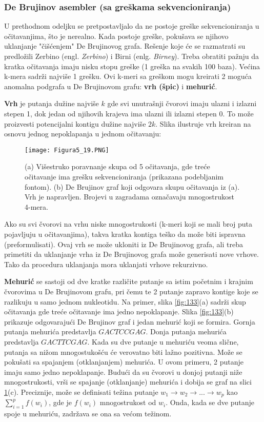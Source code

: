 \documentclass[12pt,oneside]{memoir}
\begin{document}
\subsubsection{De Brujinov asembler (sa greškama sekvencioniranja)}

U prethodnom odeljku se pretpostavljalo da ne postoje greške sekvencioniranja u očitavanjima, što je nerealno. Kada postoje greške, pokušava se njihovo uklanjanje "čišćenjem" De Brujinovog grafa. Rešenje koje će se razmatrati su predložili Zerbino (engl. \textit{Zerbino}) i Birni (enlg. \textit{Birney}). Treba obratiti pažnju da kratka očitavanja imaju nisku stopu greške (1 greška na svakih 100 baza). Većina k-mera sadrži najviše 1 grešku. Ovi k-meri sa greškom mogu kreirati 2 moguća anomalna podgrafa u De Brujinovom grafu: \textbf{vrh (špic)} i \textbf{mehurić}.

\newpage

\textbf{Vrh} je putanja dužine najviše $k$ gde svi unutrašnji čvorovi imaju ulazni i izlazni stepen 1, dok jedan od njihovih krajeva ima ulazni ili izlazni stepen 0. To može proizvesti potencijalni kontigu dužine najviše $2k$. Slika \label{fig:13} ilustruje vrh kreiran na osnovu jednog nepoklapanja u jednom očitavanju: 

\begin{figure}[!ht]
\centering
\texttt{[image: Figura5\_19.PNG]}
\caption{(a) Višestruko poravnanje skupa od 5 očitavanja, gde treće očitavanje ima grešku sekvencioniranja (prikazana podebljanim fontom). (b) De Brujinov graf koji odgovara skupu očitavanja iz (a). Vrh je napravljen. Brojevi u zagradama označavaju mnogostrukost 4-mera.}
\label{fig:13}
\end{figure}

Ako su svi čvorovi na vrhu niske mnogostrukosti (k-meri koji se mali broj puta pojavljuju u očitavanjima), takva kratka kontiga teško da može biti ispravna (preformulisati). Ovaj vrh se može ukloniti iz De Brujinovog grafa, ali treba primetiti da uklanjanje vrha iz De Brujinovog grafa može generisati nove vrhove. Tako da procedura uklanjanja mora uklanjati vrhove rekurzivno.

\textbf{Mehurić} se sastoji od dve kratke različite putanje sa istim početnim i
krajnim čvorovima u De Brujinovom grafu, pri čemu te 2 putanje zapravo kontige koje se razlikuju u samo jednom nukleotidu. Na primer, slika \ref{fig:133}(a) sadrži skup očitavanja gde treće očitavanje ima jedno nepoklapanje. Slika \ref{fig:133}(b) prikazuje odgovarajući De Brujinov graf i jedan mehurić koji se formira. Gornja putanja mehurića predstavlja $GACTCCGAG$. Donja putanja mehurića predstavlja $GACTTCGAG$. Kada su dve putanje u mehuriću veoma slične, putanja sa nižom mnogostukošću će verovatno biti lažno pozitivna. Može se pokušati sa spajanjem (otklanjanjem) mehurića. U ovom primeru, 2 putanje imaju samo jedno nepoklapanje. Budući da su čvorovi u donjoj putanji niže mnogostrukosti, vrši se spajanje (otklanjanje) mehurića i dobija se graf na slici \ref{fig:13}(c). Preciznije, može se definisati težina putanje $w_1 \rightarrow w_2 \rightarrow ... \rightarrow w_p$ kao $\sum_{i=1}^{p} f(w_i)$, gde je $f(w_i)$ mnogostrukost od $w_i$. Onda, kada se dve putanje spoje u mehuriću, zadržava se ona sa većom težinom.
\end{document}
